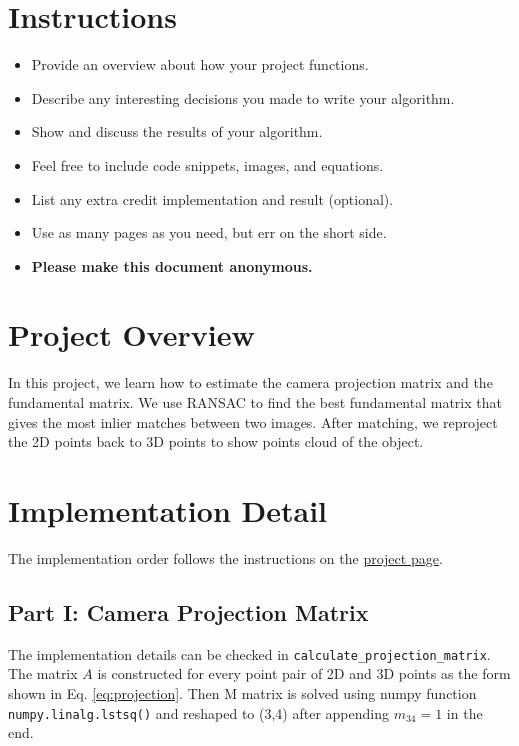 \section*{Instructions}
\begin{itemize}
    \item Provide an overview about how your project functions.
    \item Describe any interesting decisions you made to write your algorithm.
    \item Show and discuss the results of your algorithm.
    \item Feel free to include code snippets, images, and equations.
    \item List any extra credit implementation and result (optional).
    \item Use as many pages as you need, but err on the short side.
    \item \textbf{Please make this document anonymous.}
\end{itemize}

\section*{Project Overview}
In this project, we learn how to estimate the camera projection matrix and the fundamental matrix. We use RANSAC to find the best fundamental matrix that gives the most inlier matches between two images. After matching, we reproject the 2D points back to 3D points to show points cloud of the object.

\section*{Implementation Detail}
The implementation order follows the instructions on the \href{https://browncsci1430.github.io/webpage/proj5_cameras/}{project page}.

\subsection*{Part I: Camera Projection Matrix}
The implementation details can be checked in \texttt{calculate\_projection\_matrix}. The matrix $A$ is constructed for every point pair of 2D and 3D points as the form shown in Eq. \ref{eq:projection}. Then M matrix is solved using numpy function \texttt{numpy.linalg.lstsq()} and reshaped to (3,4) after appending $m_{34}=1$ in the end.

